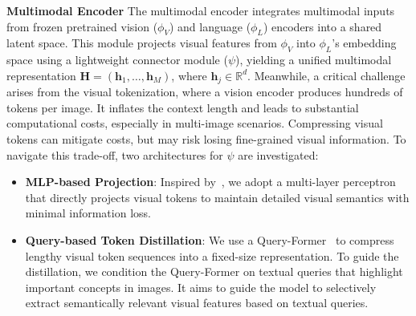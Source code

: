 \textbf{Multimodal Encoder}
The multimodal encoder integrates multimodal inputs from frozen pretrained vision ($\phi_V$) and language ($\phi_L$) encoders into a shared latent space. This module projects visual features from $\phi_V$ into $\phi_L$'s embedding space using a lightweight connector module ($\psi$), yielding a unified multimodal representation $\mathbf{H} = (\mathbf{h}_1, \dots, \mathbf{h}_{M})$, where $\mathbf{h}_j \in \mathbb{R}^{d}$. 
Meanwhile, a critical challenge arises from the visual tokenization, where a vision encoder produces hundreds of tokens per image. It inflates the context length and leads to substantial computational costs, especially in multi-image scenarios. Compressing visual tokens can mitigate costs,  but may risk losing fine-grained visual information. To navigate this trade-off, two architectures for $\psi$ are investigated:

\begin{itemize}[left=2pt, itemsep=0.5pt,topsep=0.5pt]
    \item \textbf{MLP-based Projection}: Inspired by~\cite{liu2023llava}, we adopt a multi-layer perceptron that directly projects visual tokens to maintain detailed visual semantics with minimal information loss.
\item \textbf{Query-based Token Distillation}: We use a Query-Former~\cite{li2023blip2} to compress lengthy visual token sequences into a fixed-size representation. To guide the distillation, we condition the Query-Former on textual queries\citep{li2023blipdiffusionpretrainedsubjectrepresentation,2023instructblip} that highlight important concepts in images. It aims to guide the model to selectively extract semantically relevant visual features based on textual queries.
\end{itemize}



